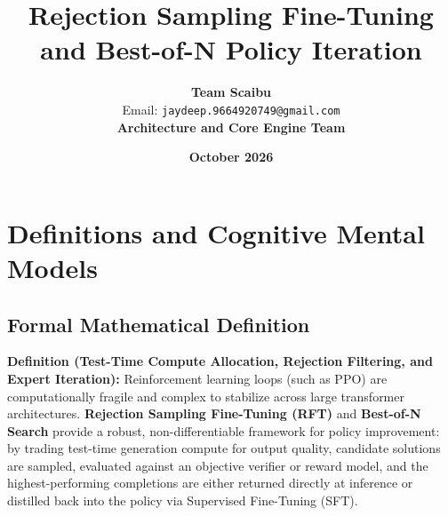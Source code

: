 \documentclass[11pt,a4paper]{article}
\title{\textbf{Rejection Sampling Fine-Tuning and Best-of-N Policy Iteration}}
\author{\textbf{Team Scaibu} \\ \small Email: \texttt{jaydeep.9664920749@gmail.com} \\ \small \textbf{Architecture and Core Engine Team}}
\date{\textbf{October 2026}}
\theoremstyle{definition}
\begin{document}
\maketitle

\section{Definitions and Cognitive Mental Models}

\subsection{Formal Mathematical Definition}
\textbf{Definition (Test-Time Compute Allocation, Rejection Filtering, and Expert Iteration):}
Reinforcement learning loops (such as PPO) are computationally fragile and complex to stabilize across large transformer architectures. \textbf{Rejection Sampling Fine-Tuning (RFT)} and \textbf{Best-of-N Search} provide a robust, non-differentiable framework for policy improvement: by trading test-time generation compute for output quality, candidate solutions are sampled, evaluated against an objective verifier or reward model, and the highest-performing completions are either returned directly at inference or distilled back into the policy via Supervised Fine-Tuning (SFT).
\end{document}
